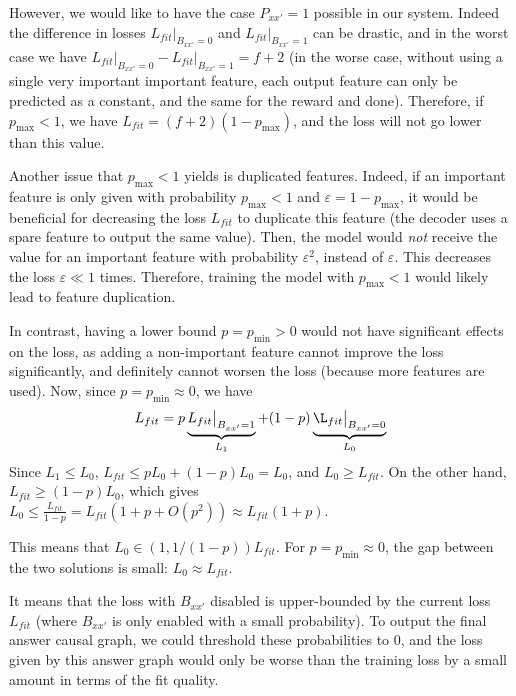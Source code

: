 \documentclass[a4paper,11pt,oneside]{report}
\begin{document}
However, we would like to have the case $P_{xx'}=1$ possible in our system. Indeed the difference in losses $L_{fit}\big|_{B_{xx'}=0}$ and $L_{fit}\big|_{B_{xx'}=1}$ can be drastic, and in the worst case we have $L_{fit}\big|_{B_{xx'}=0}-L_{fit}\big|_{B_{xx'}=1}=f+2$ (in the worse case, without using a single very important important feature, each output feature can only be predicted as a constant, and the same for the reward and done). Therefore, if $p_{\max}<1$, we have $L_{fit}=(f+2)(1-p_{\max})$, and the loss will not go lower than this value.

Another issue that $p_{\max}<1$ yields is duplicated features. Indeed, if an important feature is only given with probability $p_{\max}<1$ and $\varepsilon=1-p_{\max}$, it would be beneficial for decreasing the loss $L_{fit}$ to duplicate this feature (the decoder uses a spare feature to output the same value). Then, the model would {\em not} receive the value for an important feature with probability $\varepsilon^2$, instead of $\varepsilon$. This decreases the loss $\varepsilon\ll 1$ times. Therefore, training the model with $p_{\max}<1$ would likely lead to feature duplication.

In contrast, having a lower bound $p=p_{\min}>0$ would not have significant effects on the loss, as adding a non-important feature cannot improve the loss significantly, and definitely cannot worsen the loss (because more features are used). Now, since $p=p_{\min}\approx 0$, we have
$$
L_{fit}=p\underbrace{L_{fit}\big|_{B_{xx'}=1}}_{L_1}+(1-p)\underbrace{\L_{fit}\big|_{B_{xx'}=0}}_{L_0}
$$
Since $L_1\leq L_0$, $L_{fit}\leq pL_0+(1-p)L_0=L_0$, and $L_0\geq L_{fit}$. On the other hand, $L_{fit}\geq (1-p)L_0$, which gives $L_0\leq \frac{L_{fit}}{1-p}= L_{fit}(1+p+O(p^2))\approx L_{fit}(1+p)$.

This means that $L_0\in (1, 1/(1-p))L_{fit}$. For $p=p_{\min}\approx 0$, the gap between the two solutions is small: $L_0\approx L_{fit}$.

It means that the loss with $B_{xx'}$ disabled is upper-bounded by the current loss $L_{fit}$ (where $B_{xx'}$ is only enabled with a small probability). To output the final answer causal graph, we could threshold these probabilities to $0$, and the loss given by this answer graph would only be worse than the training loss by a small amount in terms of the fit quality.
\end{document}
